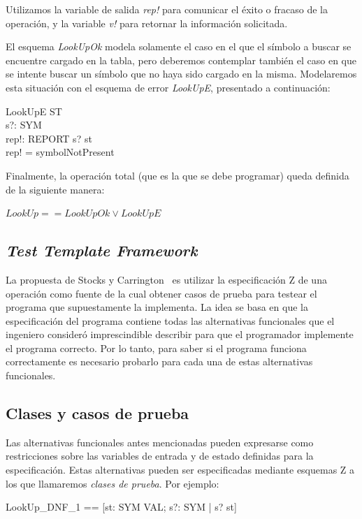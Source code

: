 Utilizamos la variable de salida \emph{rep!} para comunicar el éxito o fracaso de la operación, y la variable \emph{v!} para retornar la información solicitada. 

El esquema \emph{LookUpOk} modela solamente el caso en el que el símbolo a buscar se encuentre cargado en la tabla, pero deberemos contemplar también el caso en que se intente buscar un símbolo que no haya sido cargado en la misma. Modelaremos esta situación con el esquema de error \emph{LookUpE}, presentado a continuación:

\begin{schema}{LookUpE}
\Xi ST \\
s?: SYM \\
rep!: REPORT
\where
s? \notin \dom st \\
rep! = symbolNotPresent
\end{schema}

Finalmente, la operación total (que es la que se debe programar) queda definida de la siguiente manera:

\bigskip
$LookUp == LookUpOk \lor LookUpE$

\subsection{\emph{Test Template Framework}}

La propuesta de Stocks y Carrington~\cite{stocks} es utilizar la especificación Z de una operación como fuente de la cual obtener casos de prueba para testear el programa que supuestamente la implementa. La idea se basa en que la especificación del programa contiene todas las alternativas funcionales que el ingeniero consideró imprescindible describir para que el programador implemente el programa correcto. Por lo tanto, para saber si el programa funciona correctamente es necesario probarlo para cada una de estas alternativas funcionales. 

\subsection{Clases y casos de prueba}

Las alternativas funcionales antes mencionadas pueden expresarse como restricciones sobre las variables de entrada y de estado definidas para la especificación. Estas alternativas pueden ser especificadas mediante esquemas Z a los que llamaremos \emph{clases de prueba}. Por ejemplo:

\begin{zed}
   LookUp\_DNF\_1 == [st: SYM \pfun VAL; s?: SYM  | s? \in \dom st] \\
\end{zed}

